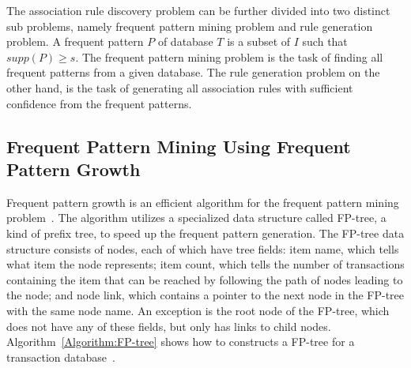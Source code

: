 The association rule discovery problem can be further divided into two distinct sub problems, namely frequent pattern mining problem and rule generation problem. A frequent pattern $P$ of database $T$ is a subset of $I$ such that $supp(P) \geq s$. The frequent pattern mining problem is the task of finding all frequent patterns from a given database. The rule generation problem on the other hand, is the task of generating all association rules with sufficient confidence from the frequent patterns. 

\subsection{Frequent Pattern Mining Using Frequent Pattern Growth}

Frequent pattern growth is an efficient algorithm for the frequent pattern mining problem~\cite{Han:2000:MFP:335191.335372}. The algorithm utilizes a specialized data structure called FP-tree, a kind of prefix tree, to speed up the frequent pattern generation. The FP-tree data structure consists of nodes, each of which have tree fields: item name, which tells what item the node represents; item count, which tells the number of transactions containing the item that can be reached by following the path of nodes leading to the node; and node link, which contains a pointer to the next node in the FP-tree with the same node name. An exception is the root node of the FP-tree, which does not have any of these fields, but only has links to child nodes. Algorithm~\ref{Algorithm:FP-tree} shows how to constructs a FP-tree for a transaction database~\cite{Han:2000:MFP:335191.335372}.


